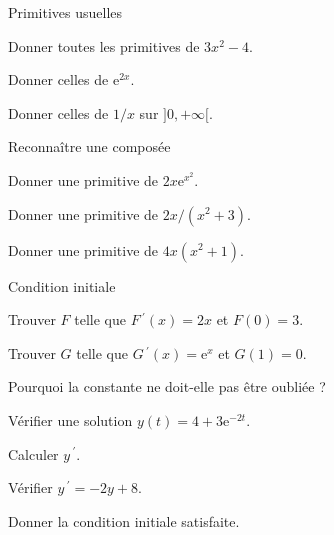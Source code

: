 \exercices
{}
\begingroup\renewcommand{\otBesoinPlace}[1]{}\begin{minipage}{\linewidth}
\begin{exercice}[1]{Primitives usuelles}

\begin{questions}
\item Donner toutes les primitives de $3x^2-4$.
\item Donner celles de $\mathrm e^{2x}$.
\item Donner celles de $1/x$ sur $]0,+\infty[$.
\end{questions}
\end{exercice}
\begin{exercice}[1]{Reconnaître une composée}

\begin{questions}
\item Donner une primitive de $2x\mathrm e^{x^2}$.
\item Donner une primitive de $2x/(x^2+3)$.
\item Donner une primitive de $4x(x^2+1)$.
\end{questions}
\end{exercice}
\begin{exercice}[1]{Condition initiale}

\begin{questions}
\item Trouver $F$ telle que $F\,\!^{\prime}(x)=2x$ et $F(0)=3$.
\item Trouver $G$ telle que $G\,\!^{\prime}(x)=\mathrm e^x$ et $G(1)=0$.
\item Pourquoi la constante ne doit-elle pas être oubliée ?
\end{questions}
\end{exercice}
\begin{exercice}[1]{Vérifier une solution}
$y(t)=4+3\mathrm e^{-2t}$.
\begin{questions}
\item Calculer $y\,\!^{\prime}$.
\item Vérifier $y\,\!^{\prime}=-2y+8$.
\item Donner la condition initiale satisfaite.
\end{questions}
\end{exercice}
\end{minipage}\endgroup
\clearpage
{}
